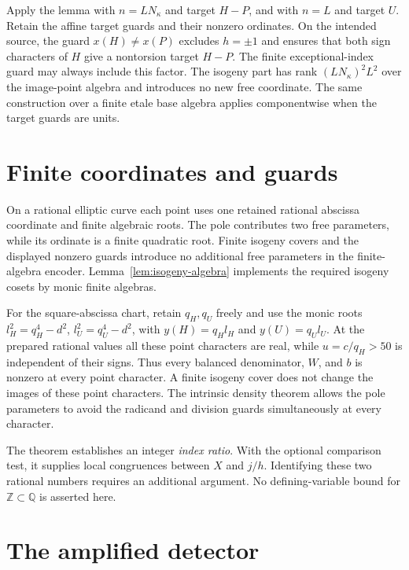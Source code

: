 \documentclass[11pt,a4paper]{article}
\newcommand{\Q}{\mathbb Q}\newcommand{\Z}{\mathbb Z}
\begin{document}
Apply the lemma with $n=LN_\kappa$ and target $H-P$, and
with $n=L$ and target $U$. Retain the affine target guards and
their nonzero ordinates. On the intended source, the guard
$x(H)\ne x(P)$ excludes $h=\pm1$ and ensures that both
sign characters of $H$ give a nontorsion target $H-P$.
The finite exceptional-index guard may always include this
factor. The isogeny part has rank $(LN_\kappa)^2L^2$ over the
image-point algebra and introduces no new free coordinate.
The same construction over a finite etale base algebra applies
componentwise when the target guards are units.

\section{Finite coordinates and guards}\label{sec:scope}

On a rational elliptic curve each point uses one retained rational
abscissa coordinate and finite algebraic roots. The pole contributes
two free parameters, while its ordinate is a finite quadratic root.
Finite isogeny covers and the displayed nonzero guards introduce no
additional free parameters in the finite-algebra encoder.
Lemma~\ref{lem:isogeny-algebra} implements the required isogeny
cosets by monic finite algebras.

For the square-abscissa chart, retain $q_H,q_U$ freely and use
the monic roots $l_H^2=q_H^4-d^2$, $l_U^2=q_U^4-d^2$, with
$y(H)=q_Hl_H$ and $y(U)=q_Ul_U$. At the prepared rational
values all these point characters are real, while $u=c/q_H>50$
is independent of their signs. Thus every balanced denominator,
$W$, and $b$ is nonzero at every point character. A finite isogeny
cover does not change the images of these point characters.
The intrinsic density theorem allows the pole parameters to avoid
the radicand and division guards simultaneously at every character.

The theorem establishes an integer \emph{index ratio}. With the
optional comparison test, it supplies local congruences between
$X$ and $j/h$. Identifying these two rational numbers requires
an additional argument. No defining-variable bound for
$\Z\subset\Q$ is asserted here.

\section{The amplified detector}
\end{document}
